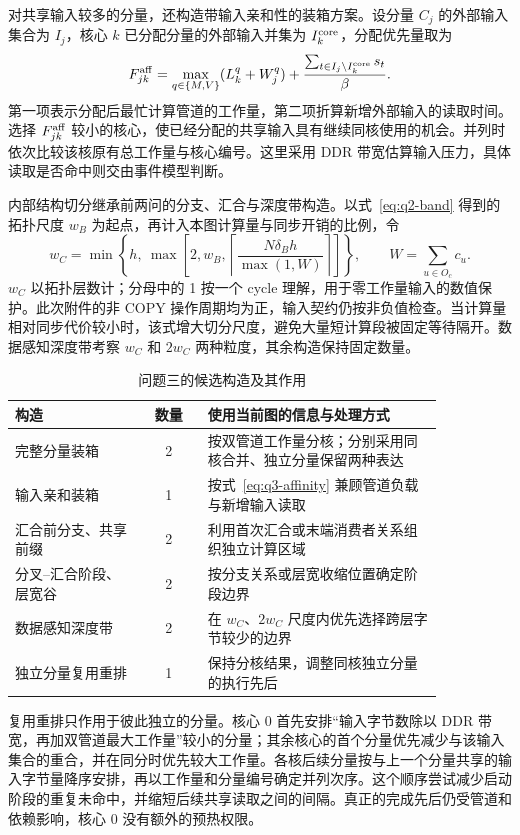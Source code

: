 对共享输入较多的分量，还构造带输入亲和性的装箱方案。设分量 $C_j$ 的外部输入集合为 $I_j$，核心 $k$ 已分配分量的外部输入并集为 $I_k^{\rm core}$，分配优先量取为
\begin{equation}
F_{jk}^{\rm aff}=\max_{q\in\{M,V\}}(L_k^q+W_j^q)
+\frac{\sum_{t\in I_j\setminus I_k^{\rm core}}s_t}{\beta}.
\label{eq:q3-affinity}
\end{equation}
第一项表示分配后最忙计算管道的工作量，第二项折算新增外部输入的读取时间。选择 $F_{jk}^{\rm aff}$ 较小的核心，使已经分配的共享输入具有继续同核使用的机会。并列时依次比较该核原有总工作量与核心编号。这里采用 DDR 带宽估算输入压力，具体读取是否命中则交由事件模型判断。

内部结构切分继承前两问的分支、汇合与深度带构造。以式~\eqref{eq:q2-band} 得到的拓扑尺度 $w_B$ 为起点，再计入本图计算量与同步开销的比例，令
\begin{equation}
w_C=\min\left\{h,\ \max\left[2,w_B,
\left\lceil\frac{N\delta_Bh}{\max(1,W)}\right\rceil\right]\right\},
\qquad W=\sum_{u\in O_c}c_u.
\label{eq:q3-width}
\end{equation}
$w_C$ 以拓扑层数计；分母中的 1 按一个 cycle 理解，用于零工作量输入的数值保护。此次附件的非 COPY 操作周期均为正，输入契约仍按非负值检查。当计算量相对同步代价较小时，该式增大切分尺度，避免大量短计算段被固定等待隔开。数据感知深度带考察 $w_C$ 和 $2w_C$ 两种粒度，其余构造保持固定数量。

\begin{table}[htbp]
\centering
\caption{问题三的候选构造及其作用}
\label{tab:q3-candidates}
\begin{tabular}{p{0.30\linewidth}cp{0.55\linewidth}}
\hline
构造 & 数量 & 使用当前图的信息与处理方式 \\
\hline
完整分量装箱 & 2 & 按双管道工作量分核；分别采用同核合并、独立分量保留两种表达 \\
输入亲和装箱 & 1 & 按式~\eqref{eq:q3-affinity} 兼顾管道负载与新增输入读取 \\
汇合前分支、共享前缀 & 2 & 利用首次汇合或末端消费者关系组织独立计算区域 \\
分叉--汇合阶段、层宽谷 & 2 & 按分支关系或层宽收缩位置确定阶段边界 \\
数据感知深度带 & 2 & 在 $w_C$、$2w_C$ 尺度内优先选择跨层字节较少的边界 \\
独立分量复用重排 & 1 & 保持分核结果，调整同核独立分量的执行先后 \\
\hline
\end{tabular}
\end{table}

复用重排只作用于彼此独立的分量。核心 0 首先安排“输入字节数除以 DDR 带宽，再加双管道最大工作量”较小的分量；其余核心的首个分量优先减少与该输入集合的重合，并在同分时优先较大工作量。各核后续分量按与上一个分量共享的输入字节量降序安排，再以工作量和分量编号确定并列次序。这个顺序尝试减少启动阶段的重复未命中，并缩短后续共享读取之间的间隔。真正的完成先后仍受管道和依赖影响，核心 0 没有额外的预热权限。


